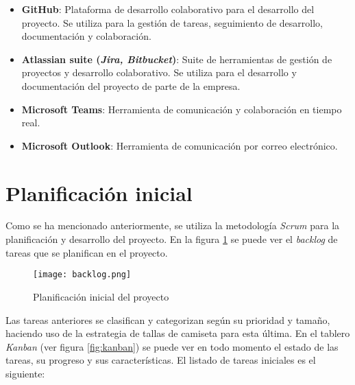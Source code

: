 \begin{itemize}
	\item \textbf{GitHub}: Plataforma de desarrollo colaborativo para el desarrollo del proyecto.
		Se utiliza para la gestión de tareas, seguimiento de desarrollo, documentación y
		colaboración.
	\item \textbf{Atlassian suite (\emph{Jira, Bitbucket})}: Suite de herramientas de gestión de proyectos
		y desarrollo colaborativo. Se utiliza para el desarrollo y documentación del proyecto de
		parte de la empresa.
	\item \textbf{Microsoft Teams}: Herramienta de comunicación y colaboración en tiempo real.
	\item \textbf{Microsoft Outlook}: Herramienta de comunicación por correo electrónico.
\end{itemize}

\newpage{}
\section{Planificación inicial}\label{sec:planif_inicial}
Como se ha mencionado anteriormente, se utiliza la metodología \textit{Scrum} para la planificación
y desarrollo del proyecto. En la figura \ref{fig:backlog} se puede ver el \textit{backlog}
de tareas que se planifican en el proyecto.

\begin{figure}[H]
	\centering
	\texttt{[image: backlog.png]}
	\caption{Planificación inicial del proyecto}
	\label{fig:backlog}
\end{figure}

Las tareas anteriores se clasifican y categorizan según su prioridad y tamaño, haciendo uso de la
estrategia de tallas de camiseta para esta última. En el tablero \textit{Kanban} (ver figura
\ref{fig:kanban}) se puede ver en todo momento el estado de las tareas, su progreso y sus
características. El listado de tareas iniciales es el siguiente:

